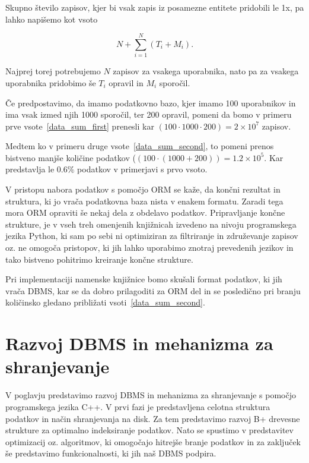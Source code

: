 \documentclass[a4paper,12pt,openright]{book}
\begin{document}
    \noindent
    Skupno število zapisov, kjer bi vsak zapis iz posamezne entitete pridobili le 1x, pa lahko napišemo kot vsoto

    \begin{equation}
        N + \sum_{i=1}^{N} (T_i + M_i).
    \label{data_sum_second}
    \end{equation}

    \noindent
    Najprej torej potrebujemo $N$ zapisov za vsakega uporabnika, nato pa za vsakega uporabnika pridobimo še $T_i$ opravil in $M_i$ sporočil.
    
    Če predpostavimo, da imamo podatkovno bazo, kjer imamo \num{100} uporabnikov in ima vsak izmed njih \num{1000} sporočil, ter \num{200} opravil, pomeni da bomo v primeru prve vsote~\eqref{data_sum_first} prenesli kar $(100 \cdot 1000 \cdot 200) = 2 \times 10^7$ zapisov.

    Medtem ko v primeru druge vsote~\eqref{data_sum_second}, to pomeni prenos bistveno manjše količine podatkov ($(100 \cdot (1000 + 200)) = 1.2 \times 10^5$. Kar predstavlja le $0.6\%$ podatkov v primerjavi s prvo vsoto.

    V pristopu nabora podatkov s pomočjo ORM se kaže, da končni rezultat in struktura, ki jo vrača podatkovna baza nista v enakem formatu. Zaradi tega mora ORM opraviti še nekaj dela z obdelavo podatkov. Pripravljanje končne strukture, je v vseh treh omenjenih knjižnicah izvedeno na nivoju programskega jezika Python, ki sam po sebi ni optimiziran za filtriranje in združevanje zapisov oz. ne omogoča pristopov, ki jih lahko uporabimo znotraj prevedenih jezikov in tako bistveno pohitrimo kreiranje končne strukture.

    Pri implementaciji namenske knjižnice bomo skušali format podatkov, ki jih vrača DBMS, kar se da dobro prilagoditi za ORM del in se posledično pri branju količinsko gledano približati vsoti~\eqref{data_sum_second}.

\chapter{Razvoj DBMS in mehanizma za shranjevanje}
\label{ch0}
    V poglavju predstavimo razvoj DBMS in mehanizma za shranjevanje s pomočjo programskega jezika C++. V prvi fazi je predstavljena celotna struktura podatkov in način shranjevanja na disk. Za tem predstavimo razvoj B+ drevesne strukture za optimalno indeksiranje podatkov. Nato se spustimo v predstavitev optimizacij oz. algoritmov, ki omogočajo hitrejše branje podatkov in za zaključek še predstavimo funkcionalnosti, ki jih naš DBMS podpira.
\end{document}

